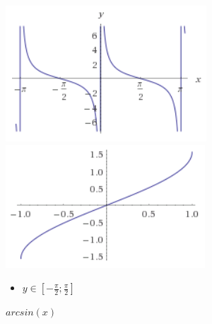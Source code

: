 \begin{figure}[ht!]
	\centering
	\begin{minipage}[t]{0.4\textwidth}
		\centering
		\includegraphics[width=\textwidth]{images/graph_cot_x}
		\caption{$cot(x)$}
	\end{minipage}
	\begin{minipage}[t]{0.4\textwidth}
		\centering
		\includegraphics[width=\textwidth]{images/graph_arcsin_x}
		\caption{$arcsin(x)$}
		\begin{itemize}
			\item $y \in [-\frac{\pi}{2};\frac{\pi}{2}]$
		\end{itemize}
	\end{minipage}
\end{figure}
